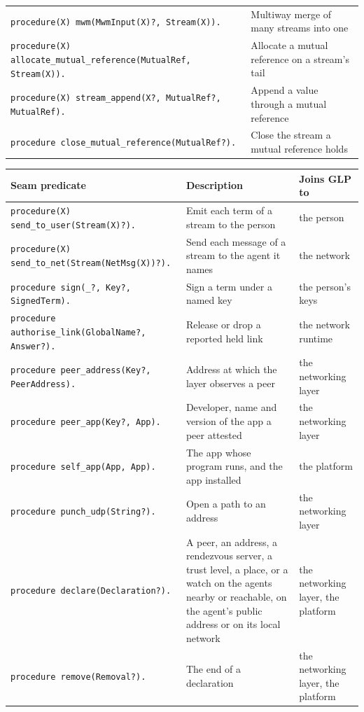 \begin{center}
{\begin{tabular}{ll}
\verb|procedure(X) mwm(MwmInput(X)?, Stream(X)).| & Multiway merge of many streams into one \\
\verb|procedure(X) allocate_mutual_reference(MutualRef, Stream(X)).| & Allocate a mutual reference on a stream's tail \\
\verb|procedure(X) stream_append(X?, MutualRef?, MutualRef).| & Append a value through a mutual reference \\
\verb|procedure close_mutual_reference(MutualRef?).| & Close the stream a mutual reference holds \\
\end{tabular}
}
\end{center}

\begin{center}
{\small
\begin{tabular}{lll}
\textbf{Seam predicate} & \textbf{Description} & \textbf{Joins GLP to} \\
\hline
\verb|procedure(X) send_to_user(Stream(X)?).| & Emit each term of a stream to the person & the person \\
\verb|procedure(X) send_to_net(Stream(NetMsg(X))?).| & Send each message of a stream to the agent it names & the network \\
\verb|procedure sign(_?, Key?, SignedTerm).| & Sign a term under a named key & the person's keys \\
\verb|procedure authorise_link(GlobalName?, Answer?).| & Release or drop a reported held link & the network runtime \\
\verb|procedure peer_address(Key?, PeerAddress).| & Address at which the layer observes a peer & the networking layer \\
\verb|procedure peer_app(Key?, App).| & Developer, name and version of the app a peer attested & the networking layer \\
\verb|procedure self_app(App, App).| & The app whose program runs, and the app installed & the platform \\
\verb|procedure punch_udp(String?).| & Open a path to an address & the networking layer \\
\verb|procedure declare(Declaration?).| & A peer, an address, a rendezvous server, a trust level, a place, or a watch on the agents nearby or reachable, on the agent's public address or on its local network & the networking layer, the platform \\
\verb|procedure remove(Removal?).| & The end of a declaration & the networking layer, the platform \\

\end{tabular}}
\end{center}
